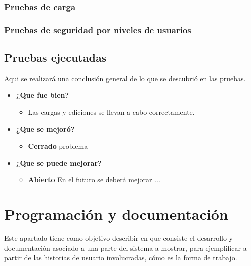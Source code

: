 \documentclass[a4paper,12pt]{article}
\begin{document}
\subsubsection{ Pruebas de carga}

\subsubsection{ Pruebas de seguridad por niveles de usuarios}


\subsection{Pruebas ejecutadas}
Aqui se realizará una conclusión general de lo que se descubrió en las pruebas.
	\begin{itemize}
		\item \textbf{¿Que fue bien?}
        	\begin{itemize}
				\item        Las cargas y ediciones se llevan a cabo correctamente.
			\end{itemize}

   		\item \textbf{¿Que se mejoró?}
        	\begin{itemize}
                \item \textbf{Cerrado} problema
			\end{itemize}

   		\item \textbf{¿Que se puede mejorar?}
        	\begin{itemize}
		        \item \textbf{Abierto} En el futuro se deberá mejorar ...
            \end{itemize}
        

	\end{itemize}











\section{Programación y documentación}
Este apartado tiene como objetivo describir en que consiste el desarrollo y documentación asociado a una parte del sistema a mostrar, para ejemplificar a partir de las historias de usuario involucradas, cómo es la forma de trabajo.
	
\end{document}
